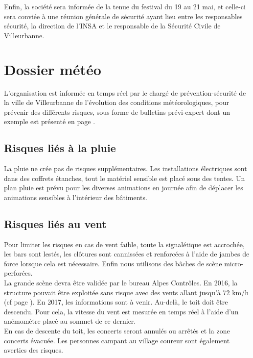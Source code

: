\documentclass[hidelinks, paper=a4, fontsize=13pt]{report}
\begin{document}
Enfin, la société sera informée de la tenue du festival du 19 au 21 mai, et celle-ci sera conviée à une réunion générale de sécurité ayant lieu entre les responsables sécurité, la direction de l'INSA et le responsable de la Sécurité Civile de Villeurbanne.

\section{Dossier météo}

L’organisation est informée en temps réel par le chargé de prévention-sécurité de la ville de Villeurbanne de l’évolution des conditions météorologiques, pour prévenir des différents risques, sous forme de bulletins prévi-expert dont un exemple est présenté en page \pageref{refMeteo}.


\subsection{Risques liés à la pluie}
La pluie ne crée pas de risques supplémentaires. Les installations électriques sont dans des coffrets étanches, tout le matériel sensible est placé sous des tentes.
Un plan pluie est prévu pour les diverses animations en journée afin de déplacer les animations sensibles à l’intérieur des bâtiments.

\subsection{Risques liés au vent}

Pour limiter les risques en cas de vent faible, toute la signalétique est accrochée, les bars sont lestés, les clôtures sont cannissées et renforcées à l’aide de jambes de force lorsque cela est nécessaire. Enfin nous utilisons des bâches de scène micro-perforées.\\

La grande scène devra être validée par le bureau Alpes Contrôles. En 2016, la structure pouvait être exploitée sans risque avec des vents allant jusqu’à 72 km/h (cf page \pageref{refVentGS}). En 2017, les informations sont à venir. Au-delà, le toit doit être descendu. Pour cela, la vitesse du vent est mesurée en temps réel à l’aide d’un anémomètre placé au sommet de ce dernier. \\

En cas de descente du toit, les concerts seront annulés ou arrêtés et la zone concerts évacuée. Les personnes campant au village coureur sont également averties des risques.
\end{document}
